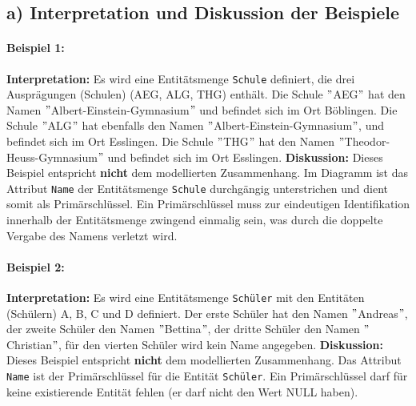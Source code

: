 \documentclass[12pt]{scrartcl}
\begin{document}


    \subsection*{a) Interpretation und Diskussion der Beispiele}

    \paragraph*{Beispiel 1:}
    \newline \textbf{Interpretation:} Es wird eine Entitätsmenge \texttt{Schule} definiert, die drei Ausprägungen (Schulen) (AEG, ALG, THG) enthält. Die Schule \("\)AEG\("\) hat den Namen \("\)Albert-Einstein-Gymnasium\("\) und befindet sich im Ort Böblingen. Die Schule \("\)ALG\("\) hat ebenfalls den Namen \("\)Albert-Einstein-Gymnasium\("\), und befindet sich im Ort Esslingen. Die Schule \("\)THG\("\) hat den Namen \("\)Theodor-Heuss-Gymnasium\("\) und befindet sich im Ort Esslingen.
    \newline\textbf{Diskussion:} Dieses Beispiel entspricht \textbf{nicht} dem modellierten Zusammenhang. Im Diagramm ist das Attribut \texttt{Name} der Entitätsmenge \texttt{Schule} durchgängig unterstrichen und dient somit als Primärschlüssel. Ein Primärschlüssel muss zur eindeutigen Identifikation innerhalb der Entitätsmenge zwingend einmalig sein, was durch die doppelte Vergabe des Namens verletzt wird.

    \paragraph*{Beispiel 2:}
    \newline \textbf{Interpretation:} Es wird eine Entitätsmenge \texttt{Schüler} mit den Entitäten (Schülern) A, B, C und D definiert. Der erste Schüler hat den Namen \("\)Andreas\("\), der zweite Schüler den Namen \("\)Bettina\("\), der dritte Schüler den Namen \("\)Christian\("\), für den vierten Schüler wird kein Name angegeben.
    \newline\textbf{Diskussion:} Dieses Beispiel entspricht \textbf{nicht} dem modellierten Zusammenhang. Das Attribut \texttt{Name} ist der Primärschlüssel für die Entität \texttt{Schüler}. Ein Primärschlüssel darf für keine existierende Entität fehlen (er darf nicht den Wert NULL haben).
\end{document}
